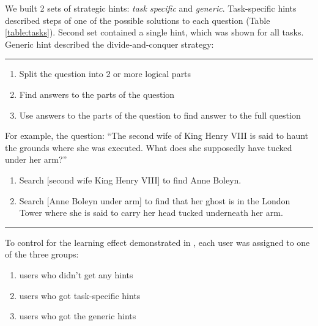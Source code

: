 \documentclass{sig-alternate}
\begin{document}
We built 2 sets of strategic hints: {\em task specific} and {\em generic}.
Task-specific hints described steps of one of the possible solutions to each question (Table \ref{table:tasks}).
Second set contained a single hint, which was shown for all tasks. Generic hint described the divide-and-conquer strategy:\\
\vspace{-2mm}
\hrule
\vspace{-2mm}
\begin{enumerate} \itemsep0pt \parskip0pt 
\item Split the question into 2 or more logical parts
\item Find answers to the parts of the question
\item Use answers to the parts of the question to find answer to the full question
\end{enumerate}
\vspace{-2mm}
For example, the question: ``The second wife of King Henry VIII is said to haunt the grounds where she was executed. What does she supposedly have tucked under her arm?''
\begin{enumerate} \itemsep0pt \parskip0pt 
\item Search [second wife King Henry VIII] to find Anne Boleyn.
\item Search [Anne Boleyn under arm] to find that her ghost is in the London Tower where she is said to carry her head tucked underneath her arm.
\end{enumerate}
\vspace{-1mm}
\hrule
\vspace{+2mm}
To control for the learning effect demonstrated in \cite{Moraveji:2011:MIU:2009916.2009966}, each user was assigned to one of the three groups:
\vspace{-2mm}
\begin{enumerate}
\item users who didn't get any hints
\vspace{-2mm}
\item users who got task-specific hints
\vspace{-2mm}
\item users who got the generic hints
\end{enumerate}
\end{document}
